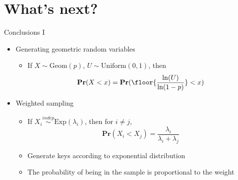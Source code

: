 \documentclass[aspectratio=169, handout]{beamer}
\begin{document}
\section{What's next?}
\frame{\tableofcontents[currentsection]}

\begin{frame}{Conclusions I}
    \begin{itemize}
        \item<1-> Generating geometric random variables
              \begin{itemize}
                  \item If $X \sim \text{Geom}(p)$, $U \sim \text{Uniform}(0, 1)$, then
                        $$
                            \textbf{Pr}(X < x) = \textbf{Pr}(\floor{\frac{\ln(U)}{\ln(1 - p)}} < x)
                        $$
              \end{itemize}
        \item<2-> Weighted sampling
              \begin{itemize}
                  \item If $X_i \overset{indep}{\sim} \text{Exp}(\lambda_i)$, then for $i \ne j$,
                        $$
                            \textbf{Pr}(X_i < X_j) = \frac{\lambda_i}{\lambda_i + \lambda_j}
                        $$
                        \vspace{-\baselineskip}
                  \item Generate keys according to exponential distribution
                  \item The probability of being in the sample is proportional to the weight
              \end{itemize}
    \end{itemize}
\end{frame}
\end{document}
